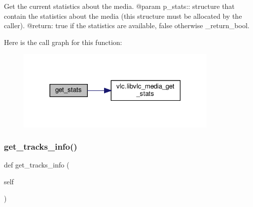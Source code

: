 \begin{DoxyVerb}Get the current statistics about the media.
@param p_stats:: structure that contain the statistics about the media (this structure must be allocated by the caller).
@return: true if the statistics are available, false otherwise \libvlc_return_bool.
\end{DoxyVerb}
 Here is the call graph for this function\+:
\nopagebreak
\begin{figure}[H]
\begin{center}
\leavevmode
\includegraphics[width=278pt]{classvlc_1_1_media_a26b214f5903f07d59990ad524ef188b0_cgraph}
\end{center}
\end{figure}
\mbox{\label{classvlc_1_1_media_ade0a1ca6f083233d0027e4b9fdb68d8a}} 
\subsubsection{\texorpdfstring{get\+\_\+tracks\+\_\+info()}{get\_tracks\_info()}}
{\footnotesize\ttfamily def get\+\_\+tracks\+\_\+info (\begin{DoxyParamCaption}\item[{}]{self }\end{DoxyParamCaption})}

